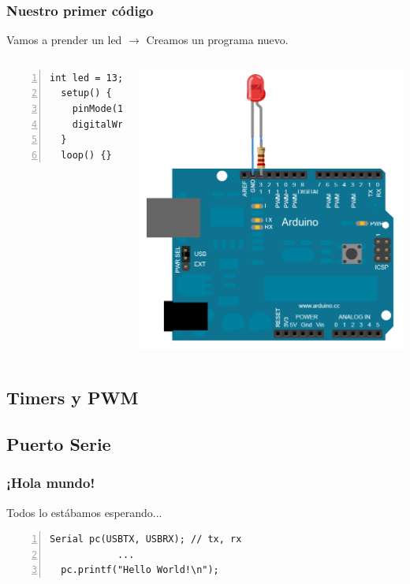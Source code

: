 \documentclass[compress]{beamer}
\begin{document}
\begin{frame}[fragile]
\frametitle{Nuestro primer código}
Vamos a prender un led $\rightarrow$ Creamos un programa nuevo.
\begin{columns}
  \begin{Verbatim}[formatcom=\color{red},fontseries=b, numbers=left,numbersep=3pt]
  int led = 13;
  setup() {
    pinMode(13, OUTPUT);
    digitalWrite(13, HIGH);
  }
  loop() {}
  \end{Verbatim} 

   \includegraphics[width=\columnwidth]{./img/arduino_led.png}

\end{columns}
\end{frame}

\subsection{Timers y PWM}

\subsection{Puerto Serie}
\begin{frame}[fragile]
 \frametitle{¡Hola mundo!}
Todos lo estábamos esperando...
\begin{Verbatim}[formatcom=\color{red},fontseries=b, numbers=left,numbersep=3pt]
  Serial pc(USBTX, USBRX); // tx, rx
            ...
  pc.printf("Hello World!\n"); 
\end{Verbatim}
\begin{center}
\end{center}
\end{frame}
\end{document}
